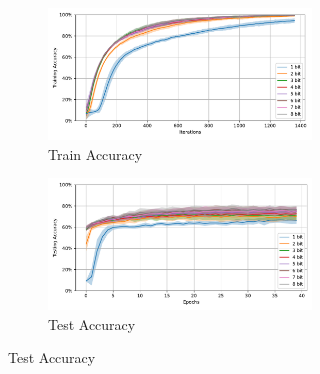     \label{appendix:accuracy_curves_dvs_gesture}
        \begin{figure}[H]
            \centering
            \begin{subfigure}[H]{0.55\textwidth}
                \centering
                \begin{subfigure}[H]{\textwidth}
                    \centering
                    \includegraphics[width=\textwidth]{../standard/DVSGesture/plots/dvsgesture_train_acc.pdf}
                    \caption{Train Accuracy}
                \end{subfigure}
                \hfill
                \begin{subfigure}[H]{\textwidth}
                    \centering
                    \includegraphics[width=\textwidth]{../standard/DVSGesture/plots/dvsgesture_test_acc.pdf}
                    \caption{Test Accuracy}
                \end{subfigure}
            \end{subfigure}
            \hfill
            \begin{subfigure}[H]{0.3\textwidth}
                \centering

\end{subfigure}
\end{figure}
